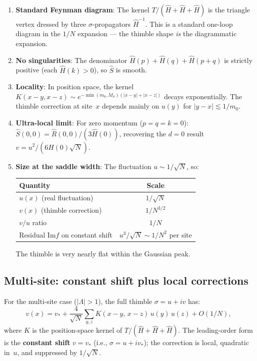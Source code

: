 \documentclass[12pt]{article}
\theoremstyle{definition}
\theoremstyle{remark}
\newcommand{\La}{\Lambda}
\newcommand{\im}{\mathrm{Im}}
\begin{document}
\begin{enumerate}
\item \textbf{Standard Feynman diagram}:
  The kernel $T/(\hat{H}+\hat{H}+\hat{H})$ is the triangle
  vertex dressed by three $\sigma$-propagators $\hat{H}^{-1}$.
  This is a standard one-loop diagram in the $1/N$ expansion ---
  the thimble shape \emph{is} the diagrammatic expansion.

\item \textbf{No singularities}: The denominator
  $\hat{H}(p) + \hat{H}(q) + \hat{H}(p{+}q)$ is strictly positive
  (each $\hat{H}(k) > 0$), so $\hat{S}$ is smooth.

\item \textbf{Locality}: In position space, the kernel
  $K(x{-}y, x{-}z) \sim e^{-\min(m_0,M_\sigma)(|x-y|+|x-z|)}$
  decays exponentially. The thimble correction at site~$x$
  depends mainly on $u(y)$ for $|y-x| \lesssim 1/m_0$.

\item \textbf{Ultra-local limit}: For zero momentum ($p = q = k = 0$):
  $\hat{S}(0,0) = \hat{R}(0,0)/(3\hat{H}(0))$, recovering the
  $d = 0$ result $v = u^2/(6\hat{H}(0)\sqrt{N})$.

\item \textbf{Size at the saddle width}: The fluctuation
  $u \sim 1/\sqrt{N}$, so:
  \begin{center}
  \begin{tabular}{|l|c|}
  \hline
  Quantity & Scale \\
  \hline
  $u(x)$ (real fluctuation) & $1/\sqrt{N}$ \\
  $v(x)$ (thimble correction) & $1/N^{3/2}$ \\
  $v/u$ ratio & $1/N$ \\
  Residual $\im f$ on constant shift & $u^3/\sqrt{N} \sim 1/N^2$ per site \\
  \hline
  \end{tabular}
  \end{center}
  The thimble is very nearly flat within the Gaussian peak.
\end{enumerate}

\subsection{Multi-site: constant shift plus local corrections}

For the multi-site case ($|\La| > 1$), the full thimble
$\sigma = u + iv$ has:
\begin{equation}
  v(x) = v_* +
    \frac{4}{\sqrt{N}}\sum_{y,z} K(x{-}y,\,x{-}z)\,u(y)\,u(z)
    + O(1/N),
\end{equation}
where $K$ is the position-space kernel of $T/(\hat{H}+\hat{H}+\hat{H})$.
The leading-order form is the \textbf{constant shift}
$v = v_*$ (i.e., $\sigma = u + iv_*$); the correction is local,
quadratic in~$u$, and suppressed by $1/\sqrt{N}$.
\end{document}
